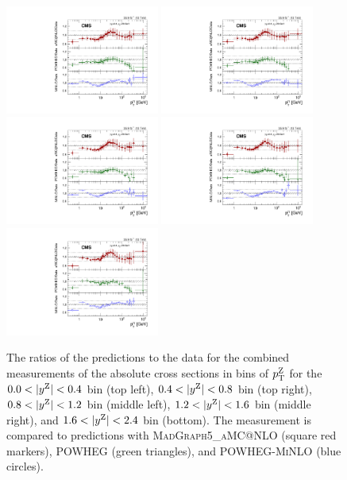 \begin{figure}
	\centering
	\includegraphics[width=0.45\textwidth]{figures/zpt/zll_double_ratio_rap0.pdf}
        \includegraphics[width=0.45\textwidth]{figures/zpt/zll_double_ratio_rap1.pdf}
        \includegraphics[width=0.45\textwidth]{figures/zpt/zll_double_ratio_rap2.pdf}
        \includegraphics[width=0.45\textwidth]{figures/zpt/zll_double_ratio_rap3.pdf}
        \includegraphics[width=0.45\textwidth]{figures/zpt/zll_double_ratio_rap4.pdf}
	\caption{The ratios of the predictions to the data for the combined measurements of the absolute cross sections in bins of $p_{\mathrm{T}}^{\mathrm{Z}}$ for the 
	$0.0 < |y^{\mathrm{Z}}| < 0.4$ bin (top left), $0.4 < |y^{\mathrm{Z}}| < 0.8$ bin (top right),
	$0.8 < |y^{\mathrm{Z}}| < 1.2$ bin (middle left), $1.2 < |y^{\mathrm{Z}}| < 1.6$ bin (middle right), and $1.6 < |y^{\mathrm{Z}}| < 2.4$ bin (bottom). The measurement is compared to predictions with \textsc{MadGraph5\_aMC@NLO} (square red markers),  \textsc{POWHEG} (green triangles), and \textsc{POWHEG-MiNLO} (blue circles).}
	\label{fig:zll_double}
\end{figure}

